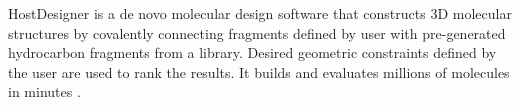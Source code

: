 HostDesigner is a de novo molecular design software that constructs 3D molecular structures by covalently connecting fragments defined by user with pre-generated hydrocarbon fragments from a library. Desired geometric constraints defined by the user are used to rank the results. It builds and evaluates millions of molecules in minutes \cite{Hay_2002}.